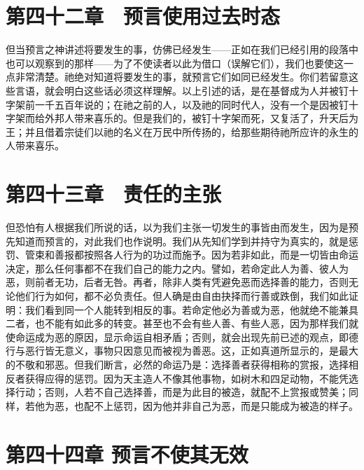 \section{第四十二章　预言使用过去时态}

但当预言之神讲述将要发生的事，仿佛已经发生——正如在我们已经引用的段落中也可以观察到的那样——为了不使读者以此为借口（误解它们），我们也要使这一点非常清楚。祂绝对知道将要发生的事，就预言它们如同已经发生。你们若留意这些言语，就会明白这些话必须这样理解。以上引述的话，是在基督成为人并被钉十字架前一千五百年说的；在祂之前的人，以及祂的同时代人，没有一个是因被钉十字架而给外邦人带来喜乐的。但是我们的，被钉十字架而死，又复活了，升天后为王；并且借着宗徒们以祂的名义在万民中所传扬的，给那些期待祂所应许的永生的人带来喜乐。\par


\section{第四十三章　责任的主张}

但恐怕有人根据我们所说的话，以为我们主张一切发生的事皆由而发生，因为是预先知道而预言的，对此我们也作说明。我们从先知们学到并持守为真实的，就是惩罚、管束和善报都按照各人行为的功过而施予。因为若非如此，而是一切皆由命运决定，那么任何事都不在我们自己的能力之内。譬如，若命定此人为善、彼人为恶，则前者无功，后者无咎。再者，除非人类有凭避免恶而选择善的能力，否则无论他们行为如何，都不必负责任。但人确是由自由抉择而行善或跌倒，我们如此证明：我们看到同一个人能转到相反的事。若命定他必为善或为恶，他就绝不能兼具二者，也不能有如此多的转变。甚至也不会有些人善、有些人恶，因为那样我们就使命运成为恶的原因，显示命运自相矛盾；否则，就会出现先前已述的观点，即德行与恶行皆无意义，事物只因意见而被视为善恶。这，正如真道所显示的，是最大的不敬和邪恶。但我们断言，必然的命运乃是：选择善者获得相称的赏报，选择相反者获得应得的惩罚。因为天主造人不像其他事物，如树木和四足动物，不能凭选择行动；否则，人若不自己选择善，而是为此目的被造，就配不上赏报或赞美；同样，若他为恶，也配不上惩罚，因为他并非自己为恶，而是只能成为被造的样子。\par


\section{第四十四章 预言不使其无效}

